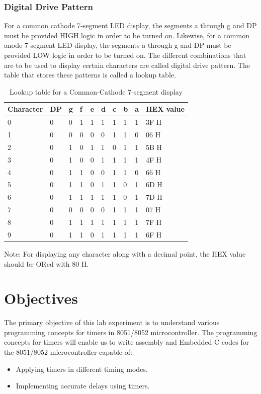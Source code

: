 \documentclass{lab_sheet}
\newcommand{\digitalpattern}[1]{
    \begin{tabular}{C{2cm}C{1cm}C{1cm}C{1cm}C{1cm}C{1cm}C{1cm}C{1cm}C{1cm}C{2cm}}
        \toprule
          Character & DP & g & f & e & d & c & b & a & HEX value\\
          \midrule
          #1
          \bottomrule
       \end{tabular}
}
\begin{document}
    \subsubsection{Digital Drive Pattern}
    For a common cathode 7-segment LED display, the segments a through g and DP must be provided HIGH logic in order to be turned on. Likewise, for a common anode 7-segment LED display, the segments a through g and DP must be provided LOW logic in order to be turned on. The different combinations that are to be used to display certain characters are called digital drive pattern. The table that stores these patterns is called a lookup table.
    \begin{table}[H]
        \centering
        \begin{threeparttable}
        \digitalpattern{0 & 0 & 0 & 1 & 1 & 1 & 1 & 1 & 1 & 3F H\\
        1 & 0 & 0 & 0 & 0 & 0 & 1 & 1 & 0 & 06 H\\
        2 & 0 & 1 & 0 & 1 & 1 & 0 & 1 & 1 & 5B H\\
        3 & 0 & 1 & 0 & 0 & 1 & 1 & 1 & 1 & 4F H\\
        4 & 0 & 1 & 1 & 0 & 0 & 1 & 1 & 0 & 66 H\\
        5 & 0 & 1 & 1 & 0 & 1 & 1 & 0 & 1 & 6D H\\
        6 & 0 & 1 & 1 & 1 & 1 & 1 & 0 & 1 & 7D H\\
        7 & 0 & 0 & 0 & 0 & 0 & 1 & 1 & 1 & 07 H\\
        8 & 0 & 1 & 1 & 1 & 1 & 1 & 1 & 1 & 7F H\\
        9 & 0 & 1 & 1 & 0 & 1 & 1 & 1 & 1 & 6F H\\}
  \begin{tablenotes}
    \small
    \item Note: For displaying any character along with a decimal point, the HEX value should be ORed with 80 H.
  \end{tablenotes}
  \caption{Lookup table for a Common-Cathode 7-segment display}
  \label{tbl:cc}
        \end{threeparttable}
    \end{table}
    \section{Objectives}
    The primary objective of this lab experiment is to understand various programming concepts for timers in 8051/8052 microcontroller. The programming concepts for timers will enable us to write assembly and Embedded C codes for the 8051/8052 microcontroller capable of:
    \begin{itemize}
        \item Applying timers in different timing modes.
        \item Implementing accurate delays using timers.
    \end{itemize}
\end{document}
